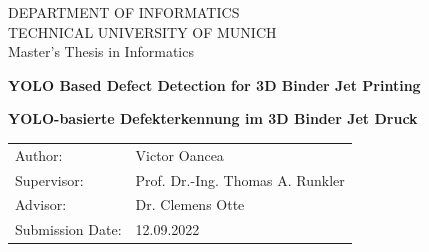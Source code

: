 \begin{titlepage}
  \centering


  \vspace{5mm}
  {\huge\MakeUppercase{Department of Informatics}}\\

  \vspace{5mm}
  {\large\MakeUppercase{Technical University of Munich}}\\

  \vspace{20mm}
  {\Large Master's Thesis in Informatics}

  \vspace{15mm}
  {\huge\bfseries YOLO Based Defect Detection for 3D Binder Jet Printing \par}

  \vspace{10mm}
  {\huge\bfseries {YOLO-basierte Defekterkennung im 3D Binder Jet Druck} \par}

  \vspace{15mm}
  \begin{tabular}{l l}
    Author:          & Victor Oancea \\
    Supervisor:      & Prof. Dr.-Ing. Thomas A. Runkler \\
    Advisor:         & Dr. Clemens Otte \\
    Submission Date: & 12.09.2022 \\
  \end{tabular}

\end{titlepage}
